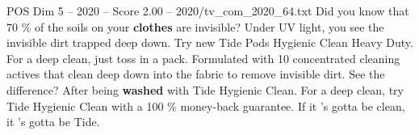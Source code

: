 \begin{textsample}{POS Dim 5 – 2020 – Score 2.00 – 2020/tv\_com\_2020\_64.txt}  \label{ex:f5_pos_032}
Did you know that 70 \% of the soils on your \textbf{clothes} are invisible?
Under UV light, you see the invisible dirt trapped deep down.
Try new Tide Pods Hygienic Clean Heavy Duty.
For a deep clean, just toss in a pack.
Formulated with 10 concentrated cleaning actives that clean deep down into the fabric to remove invisible dirt.
See the difference?
After being \textbf{washed} with Tide Hygienic Clean.
For a deep clean, try Tide Hygienic Clean with a 100 \% money-back guarantee.
If it 's gotta be clean, it 's gotta be Tide.

\end{textsample}
